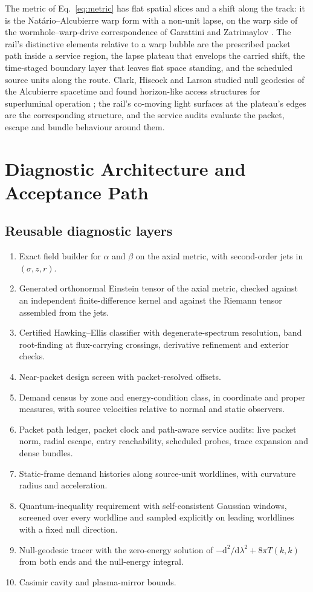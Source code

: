 \documentclass[11pt]{article}
\newcommand{\dd}{\mathrm{d}}
\newcommand{\sig}{\sigma}
\begin{document}
The metric of Eq.~\eqref{eq:metric} has flat spatial slices and a shift along the track: it is the Nat\'ario--Alcubierre warp form \cite{Alcubierre1994,Natario2002} with a non-unit lapse, on the warp side of the wormhole--warp-drive correspondence of Garattini and Zatrimaylov \cite{GarattiniZatrimaylov2024}. The rail's distinctive elements relative to a warp bubble are the prescribed packet path inside a service region, the lapse plateau that envelops the carried shift, the time-staged boundary layer that leaves flat space standing, and the scheduled source units along the route. Clark, Hiscock and Larson studied null geodesics of the Alcubierre spacetime and found horizon-like access structures for superluminal operation \cite{ClarkHiscockLarson1999,MullerWeiskopf2012}; the rail's co-moving light surfaces at the plateau's edges are the corresponding structure, and the service audits evaluate the packet, escape and bundle behaviour around them.

\section{Diagnostic Architecture and Acceptance Path}

\subsection{Reusable diagnostic layers}

\begin{enumerate}
\item Exact field builder for $\alpha$ and $\beta$ on the axial metric, with second-order jets in $(\sig,z,r)$.
\item Generated orthonormal Einstein tensor of the axial metric, checked against an independent finite-difference kernel and against the Riemann tensor assembled from the jets.
\item Certified Hawking--Ellis classifier with degenerate-spectrum resolution, band root-finding at flux-carrying crossings, derivative refinement and exterior checks.
\item Near-packet design screen with packet-resolved offsets.
\item Demand census by zone and energy-condition class, in coordinate and proper measures, with source velocities relative to normal and static observers.
\item Packet path ledger, packet clock and path-aware service audits: live packet norm, radial escape, entry reachability, scheduled probes, trace expansion and dense bundles.
\item Static-frame demand histories along source-unit worldlines, with curvature radius and acceleration.
\item Quantum-inequality requirement with self-consistent Gaussian windows, screened over every worldline and sampled explicitly on leading worldlines with a fixed null direction.
\item Null-geodesic tracer with the zero-energy solution of $-\dd^2/\dd\lambda^2+8\pi T(k,k)$ from both ends and the null-energy integral.
\item Casimir cavity and plasma-mirror bounds.
\end{enumerate}
\end{document}
